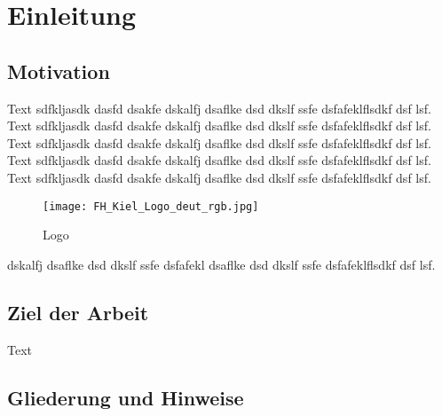 \chapter{Einleitung}
\label{ch:einleitung}

\section{Motivation}
\label{sec:motivation}

Text sdfkljasdk dasfd dsakfe dskalfj dsaflke dsd dkslf ssfe dsfafeklflsdkf dsf lsf. Text sdfkljasdk dasfd dsakfe dskalfj dsaflke dsd dkslf ssfe dsfafeklflsdkf dsf lsf. Text sdfkljasdk dasfd dsakfe dskalfj dsaflke dsd dkslf ssfe dsfafeklflsdkf dsf lsf. Text sdfkljasdk dasfd dsakfe dskalfj dsaflke dsd dkslf ssfe dsfafeklflsdkf dsf lsf. Text sdfkljasdk dasfd dsakfe dskalfj dsaflke dsd dkslf ssfe dsfafeklflsdkf dsf lsf.

\begin{figure}[ht]
	\centering
	\texttt{[image: FH\_Kiel\_Logo\_deut\_rgb.jpg]}
	\caption{Logo}
	\label{fig:fhlogo}
\end{figure}

dskalfj dsaflke dsd dkslf ssfe dsfafekl dsaflke dsd dkslf ssfe dsfafeklflsdkf dsf lsf. \cite{gasparovic1969}
\section{Ziel der Arbeit}
\label{sec:ziel}
Text

\section{Gliederung und Hinweise}
\label{sec:gliederung}

\blindtext[2]

\blindtext[3]

\blindtext[5]

\blindtext[3]